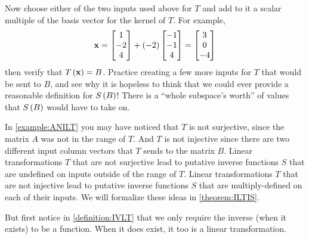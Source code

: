 \documentclass{ximera}
\begin{document}
\begin{example}
Now choose either of the two inputs used above for $T$ and add to it a scalar multiple of the basis vector for the kernel of $T$.  For example,
\[
\mathbf{x}=\begin{bmatrix}1\\-2\\4\end{bmatrix}+(-2)\begin{bmatrix}-1\\-1\\4\end{bmatrix}=\begin{bmatrix}3\\0\\-4\end{bmatrix}
\]
then verify that $T\left(\mathbf{x}\right)=B$.  Practice creating a few more inputs for $T$ that would be sent to $B$, and see why it is hopeless to think that we could ever provide a reasonable definition for $S\left(B\right)$!  There is a ``whole subspace's worth'' of values that $S\left(B\right)$ would have to take on.



\end{example}

In \ref{example:ANILT} you may have noticed that $T$ is not surjective, since the matrix $A$ was not in the range of $T$.  And $T$ is not injective since there are two different input column vectors that $T$ sends to the matrix $B$.  Linear transformations $T$ that are not surjective lead to putative inverse functions $S$ that are undefined on inputs outside of the range of $T$.  Linear transformations $T$ that are not injective lead to putative inverse functions $S$ that are multiply-defined on each of their inputs.  We will formalize these ideas in \ref{theorem:ILTIS}.



But first notice in \ref{definition:IVLT} that we only require the inverse (when it exists) to be a function.  When it does exist, it too is a linear transformation.
\end{document}
